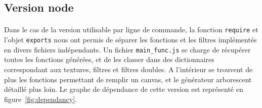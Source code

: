 \documentclass[a4paper]{article}
\begin{document}
\subsection{Version node}
\label{sec:node}

\paragraph{}
Dans le cas de la version utilisable par ligne de commande, la fonction \texttt{require} et l'objet \texttt{exports} nous ont permis de séparer les fonctions et les filtres implémentés en divers fichiers indépendants. Un fichier \texttt{main\_func.js} se charge de récupérer toutes les fonctions générées, et de les classer dans des dictionnaires correspondant aux textures, filtres et filtres doubles. A l'intérieur se trouvent de plus les fonctions permettant de remplir un canvas, et le générateur arborescent détaillé plus loin. Le graphe de dépendance de cette version est représenté en figure~\ref{fig:dependancy}.
\end{document}
